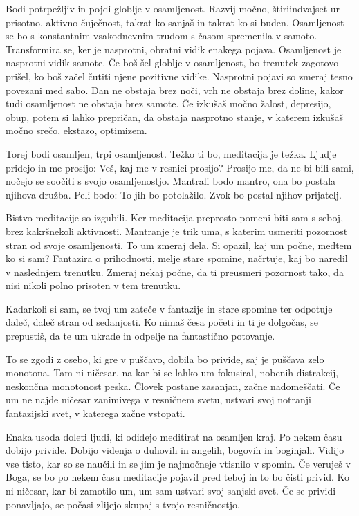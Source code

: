 Bodi potrpežljiv in pojdi globlje v osamljenost. Razvij močno, štiriindvajset ur prisotno, aktivno čuječnost, takrat ko sanjaš in takrat ko si buden. Osamljenost se bo s konstantnim vsakodnevnim trudom s časom spremenila v samoto. Transformira se, ker je nasprotni, obratni vidik enakega pojava. Osamljenost je nasprotni vidik samote. Če boš šel globlje v osamljenost, bo trenutek zagotovo prišel, ko boš začel čutiti njene pozitivne vidike. Nasprotni pojavi so zmeraj tesno povezani med sabo. Dan ne obstaja brez noči, vrh ne obstaja brez doline, kakor tudi osamljenost ne obstaja brez samote. Če izkušaš močno žalost, depresijo, obup, potem si lahko prepričan, da obstaja nasprotno stanje, v katerem izkušaš močno srečo, ekstazo, optimizem. 

Torej bodi osamljen, trpi osamljenost. Težko ti bo, meditacija je težka. Ljudje pridejo in me prosijo:  Veš, kaj me v resnici prosijo? Prosijo me, da ne bi bili sami, nočejo se soočiti s svojo osamljenostjo. Mantrali bodo mantro, ona bo postala njihova družba. Peli bodo:  To jih bo potolažilo. Zvok  bo postal njihov prijatelj. 

Bistvo meditacije so izgubili. Ker meditacija preprosto pomeni biti sam s seboj, brez kakršnekoli aktivnosti. Mantranje je trik uma, s katerim usmeriti pozornost stran od svoje osamljenosti. To um zmeraj dela. Si opazil, kaj um počne, medtem ko si sam? Fantazira o prihodnosti, melje stare spomine, načrtuje, kaj bo naredil v naslednjem trenutku. Zmeraj nekaj počne, da ti preusmeri pozornost tako, da nisi nikoli polno prisoten v tem trenutku. 

Kadarkoli si sam, se tvoj um zateče v fantazije in stare spomine ter odpotuje daleč, daleč stran od sedanjosti. Ko nimaš česa početi in ti je dolgočas, se prepustiš, da te um ukrade in odpelje na fantastično potovanje. 

To se zgodi z osebo, ki gre v puščavo, dobila bo privide, saj je puščava zelo monotona. Tam ni ničesar, na kar bi se lahko um fokusiral, nobenih distrakcij, neskončna monotonost peska. Človek postane zasanjan, začne nadomeščati. Če um ne najde ničesar zanimivega v resničnem svetu, ustvari svoj notranji fantazijski svet, v katerega začne vstopati. 

Enaka usoda doleti ljudi, ki odidejo meditirat na osamljen kraj. Po nekem času dobijo privide. Dobijo videnja o duhovih in angelih, bogovih in boginjah. Vidijo vse tisto, kar so se naučili in se jim je najmočneje vtisnilo v spomin. Če veruješ v Boga, se bo po nekem času meditacije pojavil pred teboj in to bo čisti privid. Ko ni ničesar, kar bi zamotilo um, um sam ustvari svoj sanjski svet. Če se prividi ponavljajo, se počasi zlijejo skupaj s tvojo resničnostjo. 

